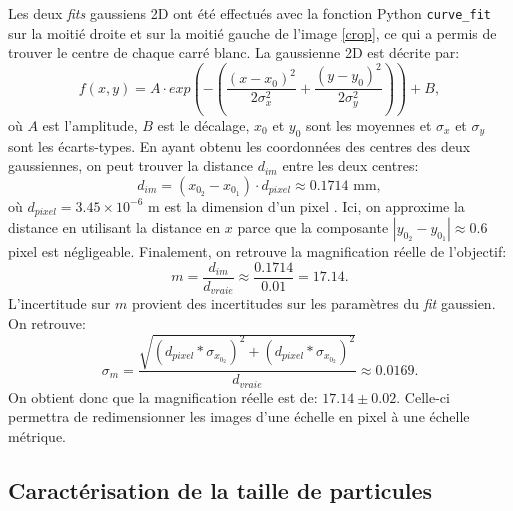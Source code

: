 \documentclass[11pt,letterpaper]{article}
\begin{document}
Les deux \textit{fits} gaussiens 2D ont été effectués avec la fonction Python \texttt{curve\_fit} sur la moitié droite et sur la moitié gauche de l'image \ref{crop},
ce qui a permis de trouver le centre de chaque carré blanc. La gaussienne 2D est décrite par:
\begin{equation}
  f(x,y)=A\cdot exp\left(-\left(\frac{(x-x_0)^2}{2\sigma_x^2}+\frac{(y-y_0)^2}{2\sigma_y^2}\right)\right)+B,
\end{equation}
où $A$ est l'amplitude, $B$ est le décalage, $x_0$ et $y_0$ sont les moyennes et $\sigma_x$ et $\sigma_y$ sont les écarts-types.
En ayant obtenu les coordonnées des centres des deux gaussiennes, on peut trouver la distance $d_{im}$ entre les deux centres:
\begin{equation}
  d_{im}=(x_{0_2}-x_{0_1})\cdot d_{pixel}\approx 0.1714 \text{ mm},
\end{equation}
où $d_{pixel}=3.45\times10^{-6}$ m est la dimension d'un pixel \cite{noauthor_thorlabs_2024-1}. Ici, on approxime la distance en utilisant la distance en $x$
parce que la composante $|y_{0_2}-y_{0_1}|\approx 0.6$ pixel est négligeable. Finalement, on retrouve la magnification réelle de l'objectif:
\begin{equation}
  m=\frac{d_{im}}{d_{vraie}}\approx\frac{0.1714}{0.01}= 17.14.
\end{equation}
L'incertitude sur $m$ provient des incertitudes sur les paramètres du \textit{fit} gaussien. 
On retrouve:
\begin{equation}
  \sigma_m=\frac{\sqrt{(d_{pixel}*\sigma_{x_{0_2}})^2+(d_{pixel}*\sigma_{x_{0_2}})^2}}{d_{vraie}}\approx0.0169.
\end{equation}
On obtient donc que la magnification réelle est de: $17.14\pm0.02$. Celle-ci permettra de redimensionner les images d'une échelle en pixel à une échelle métrique.


\subsection{Caractérisation de la taille de particules}
\end{document}
